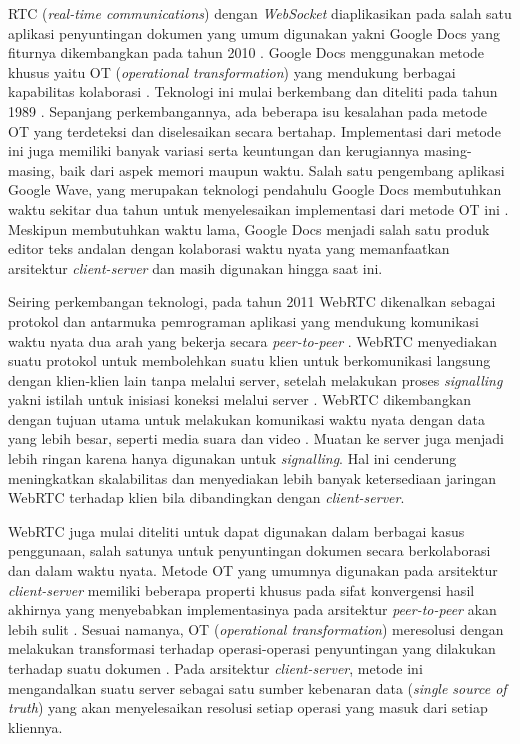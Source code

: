 RTC (\textit{real-time communications}) dengan \textit{WebSocket} diaplikasikan pada salah satu aplikasi penyuntingan dokumen yang umum digunakan yakni Google Docs yang fiturnya dikembangkan pada tahun 2010 \citep{googledocs1}. Google Docs menggunakan metode khusus yaitu OT (\textit{operational transformation}) yang mendukung berbagai kapabilitas kolaborasi \citep{googledocs2,googledocs3}. Teknologi ini mulai berkembang dan diteliti pada tahun 1989 \citep{Ellis1989}. Sepanjang perkembangannya, ada beberapa isu kesalahan pada metode OT yang terdeteksi dan diselesaikan secara bertahap. Implementasi dari metode ini juga memiliki banyak variasi serta keuntungan dan kerugiannya masing-masing, baik dari aspek memori maupun waktu. Salah satu pengembang aplikasi Google Wave, yang merupakan teknologi pendahulu Google Docs membutuhkan waktu sekitar dua tahun untuk menyelesaikan implementasi dari metode OT ini \citep{shareJS}. Meskipun membutuhkan waktu lama, Google Docs menjadi salah satu produk editor teks andalan dengan kolaborasi waktu nyata yang memanfaatkan arsitektur \textit{client-server} dan masih digunakan hingga saat ini.

Seiring perkembangan teknologi, pada tahun 2011 WebRTC dikenalkan sebagai protokol dan antarmuka pemrograman aplikasi yang mendukung komunikasi waktu nyata dua arah yang bekerja secara \textit{peer-to-peer} \citep{dutton2012getting}. WebRTC menyediakan suatu protokol untuk membolehkan suatu klien untuk berkomunikasi langsung dengan klien-klien lain tanpa melalui server, setelah melakukan proses \textit{signalling} yakni istilah untuk inisiasi koneksi melalui server \citep{sredojev2015webrtc}. WebRTC dikembangkan dengan tujuan utama untuk melakukan komunikasi waktu nyata dengan data yang lebih besar, seperti media suara dan video \citep{dutton2012getting}. Muatan ke server juga menjadi lebih ringan karena hanya digunakan untuk \textit{signalling}. Hal ini cenderung meningkatkan skalabilitas dan menyediakan lebih banyak ketersediaan jaringan WebRTC terhadap klien bila dibandingkan dengan \textit{client-server}.

WebRTC juga mulai diteliti untuk dapat digunakan dalam berbagai kasus penggunaan, salah satunya untuk penyuntingan dokumen secara berkolaborasi dan dalam waktu nyata. Metode OT yang umumnya digunakan pada arsitektur \textit{client-server} memiliki beberapa properti khusus pada sifat konvergensi hasil akhirnya yang menyebabkan implementasinya pada arsitektur \textit{peer-to-peer} akan lebih sulit \citep{Sun2017}. Sesuai namanya, OT (\textit{operational transformation}) meresolusi dengan melakukan transformasi terhadap operasi-operasi penyuntingan yang dilakukan terhadap suatu dokumen \citep{OTOverview1}. Pada arsitektur \textit{client-server}, metode ini mengandalkan suatu server sebagai satu sumber kebenaran data (\textit{single source of truth}) yang akan menyelesaikan resolusi setiap operasi yang masuk dari setiap kliennya.

